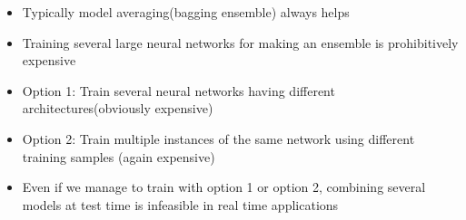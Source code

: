 \begin{frame}
\begin{columns}
{\begin{minipage}{0.31\textwidth}
		\end{minipage}}
		\begin{overlayarea}{\textwidth}{\textheight}
			\begin{itemize}
				\justifying
				\item<1->  Typically model averaging(bagging ensemble) always helps
				\item <2-> Training several large neural networks for making an ensemble is prohibitively expensive
				\item<3->  Option 1: Train several neural networks having different architectures(obviously expensive)
				\item<4->  Option 2: Train multiple instances of the same network using different training samples (again expensive)
				\item<5->  Even if we manage to train with option 1 or option 2, combining several models at test time is infeasible in real time applications
			\end{itemize}
		\end{overlayarea}
	\end{columns}
\end{frame}
				
